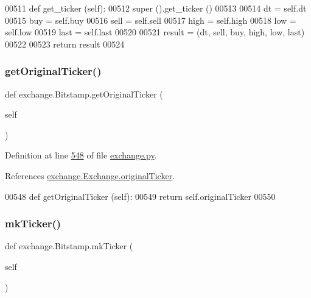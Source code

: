 \begin{DoxyCode}
00511     \textcolor{keyword}{def }get\_ticker (self):
00512         super ().get\_ticker ()
00513         
00514         dt   = self.dt
00515         buy  = self.buy
00516         sell = self.sell
00517         high = self.high
00518         low  = self.low
00519         last = self.last
00520         
00521         result = (dt, sell, buy, high, low, last)
00522         
00523         \textcolor{keywordflow}{return} result
00524     
\end{DoxyCode}
\mbox{\label{classexchange_1_1_bitstamp_a456887079f953876024ef40c5607cc91}} 
\subsubsection{\texorpdfstring{get\+Original\+Ticker()}{getOriginalTicker()}}
{\footnotesize\ttfamily def exchange.\+Bitstamp.\+get\+Original\+Ticker (\begin{DoxyParamCaption}\item[{}]{self }\end{DoxyParamCaption})}



Definition at line \hyperlink{exchange_8py_source_l00548}{548} of file \hyperlink{exchange_8py_source}{exchange.\+py}.



References \hyperlink{exchange_8py_source_l00186}{exchange.\+Exchange.\+original\+Ticker}.


\begin{DoxyCode}
00548     \textcolor{keyword}{def }getOriginalTicker (self):
00549         \textcolor{keywordflow}{return} self.originalTicker
00550         
\end{DoxyCode}
\mbox{\label{classexchange_1_1_bitstamp_a0acb03503021a5d57d19dca6a100fddc}} 
\subsubsection{\texorpdfstring{mk\+Ticker()}{mkTicker()}}
{\footnotesize\ttfamily def exchange.\+Bitstamp.\+mk\+Ticker (\begin{DoxyParamCaption}\item[{}]{self }\end{DoxyParamCaption})}



